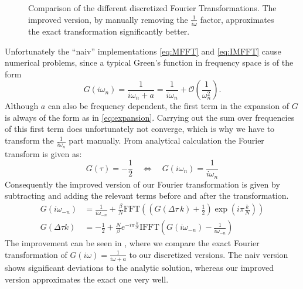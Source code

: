 \begin{appendix}
\begin{figure}[h]
	\caption{Comparison of the different discretized Fourier Transformations. The improved version, by manually removing the $\frac{1}{i \omega}$ factor, approximates the exact transformation significantly better. }
	\label{fig:fourier_traf}
\end{figure}
Unfortunately the ``naiv'' implementations \eqref{eq:MFFT} and \eqref{eq:IMFFT} cause numerical problems, since a typical Green's function in frequency space is of the form
\begin{equation}
	G(iω_n) = \frac{1}{iω_n +a} = \frac{1}{i ω_n} + \mathcal{O}\left(\frac{1}{ω_n^2}\right).
	\label{eq:expansion}
\end{equation}
Although $a$ can also be frequency dependent, the first term in the expansion of $G$ is always of the form as in \eqref{eq:expansion}. Carrying out the sum over frequencies of this first term does unfortunately not converge, which is why we have to transform the $\frac{1}{i ω_n}$ part manually. %
From analytical calculation the Fourier transform is given as:
\begin{equation}
	G(τ)=-\frac{1}{2} \quad ⇔ \quad G(i ω_n) =\frac{1}{i ω_n}
	\label{eq:ff_pair}
\end{equation}
Consequently the improved version of our Fourier transformation is given by subtracting and adding the relevant terms before and after the transformation.
\begin{align}
	G(i ω_{-n})&= \frac{1}{i ω_{-n}}+\frac{\beta}{N} \mathrm{FFT}\left( \left(G(\Delta τ \, k)+\frac{1}{2}\right)\exp{\left(i π \frac{k}{N}\right)}\right)\\
	G(\Delta τ k)&= -\frac{1}{2}+\frac{N}{β} e^{-i π \frac{k}{N}}\mathrm{IFFT}\left(G(iω_{-n})-\frac{1}{i ω_{-n}}\right)
	\label{eq:improved_fft}
\end{align}
The improvement can be seen in , where we compare the exact Fourier transformation of $G(i ω)=\frac{1}{iω+a}$ to our discretized versions. The naiv version shows significant deviations to the analytic solution, whereas our improved version approximates the exact one very well.  


\end{appendix}
